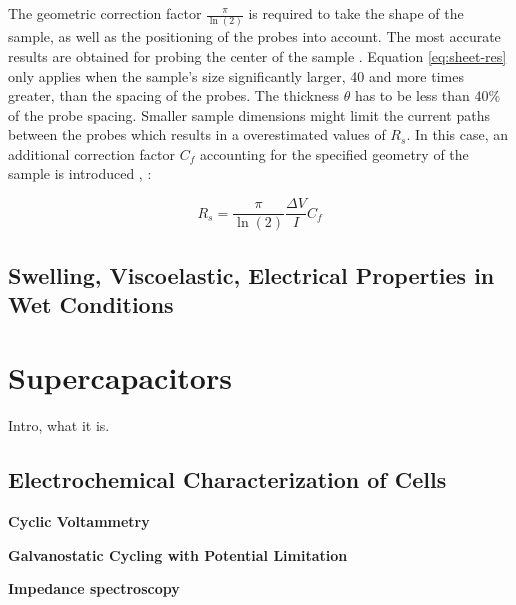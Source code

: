 The geometric correction factor $\frac{\pi}{\ln (2)}$ is required to take the shape of the sample, as well as the positioning of the probes into account. The most accurate results are obtained for probing the center of the sample \cite{ossila}. Equation \ref{eq:sheet-res} only applies when the sample's size significantly larger, 40 and more times greater, than the spacing of the probes. The thickness $\theta$ has to be less than 40\% of the probe spacing. Smaller sample dimensions might limit the current paths between the probes which results in a overestimated values of $R_s$. In this case, an additional correction factor $C_f$ accounting for the specified geometry of the sample is introduced \cite{geometr-resistivity}, \cite{geometr-resistivity-corr}:

\begin{equation}
R_s = \frac{\pi}{\ln (2)}\frac{\Delta V}{I}C_f 
\label{eq:sheet-res-corr}
\end{equation}





\subsection{Swelling, Viscoelastic, Electrical Properties in Wet Conditions}

\section{Supercapacitors}
Intro, what it is.

\subsection{Electrochemical Characterization of Cells}

\textbf{Cyclic Voltammetry}

\textbf{Galvanostatic Cycling with Potential Limitation}

\textbf{Impedance spectroscopy}



